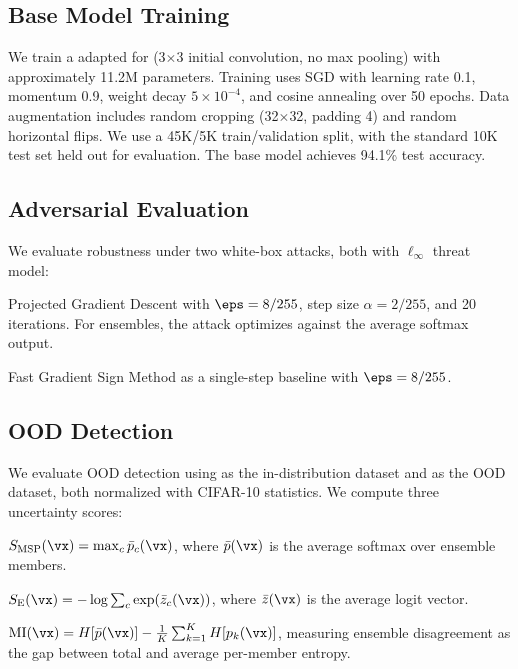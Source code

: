 \subsection{Base Model Training}

We train a \resnet adapted for \cifarten (3$\times$3 initial convolution, no max pooling) with approximately 11.2M parameters. Training uses SGD with learning rate 0.1, momentum 0.9, weight decay $5 \times 10^{-4}$, and cosine annealing over 50 epochs. Data augmentation includes random cropping (32$\times$32, padding 4) and random horizontal flips. We use a 45K/5K train/validation split, with the standard 10K test set held out for evaluation. The base model achieves 94.1\% test accuracy.

\subsection{Adversarial Evaluation}
\label{sec:adv_eval}

We evaluate robustness under two white-box attacks, both with $\ell_\infty$ threat model:

 Projected Gradient Descent \citep{madry2018towards} with $\eps = 8/255$, step size $\alpha = 2/255$, and 20 iterations. For ensembles, the attack optimizes against the average softmax output.

 Fast Gradient Sign Method as a single-step baseline with $\eps = 8/255$.

\subsection{OOD Detection}
\label{sec:ood_eval}

We evaluate OOD detection using \cifarten as the in-distribution dataset and \svhn as the OOD dataset, both normalized with CIFAR-10 statistics. We compute three uncertainty scores:

 $S_{\text{MSP}}(\vx) = \max_c \bar{p}_c(\vx)$, where $\bar{p}(\vx)$ is the average softmax over ensemble members.

 $S_{\text{E}}(\vx) = -\log \sum_c \exp(\bar{z}_c(\vx))$, where $\bar{z}(\vx)$ is the average logit vector.

 $\text{MI}(\vx) = H[\bar{p}(\vx)] - \frac{1}{K}\sum_{k=1}^K H[p_k(\vx)]$, measuring ensemble disagreement as the gap between total and average per-member entropy.

